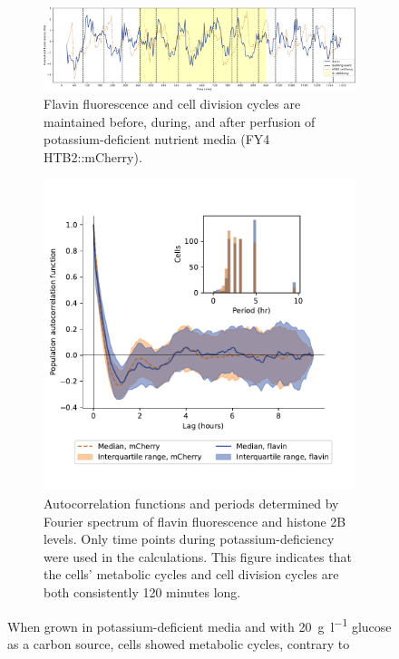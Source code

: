 \begin{figure}
  \centering
  \begin{subfigure}[htpb]{1.0\textwidth}
   \centering
   \includegraphics[width=\textwidth]{htb2mCherry_613_plots_single_htb2mCherry012_90_2_adapted.pdf}
   \caption{
     Flavin fluorescence and cell division cycles are maintained before, during, and after perfusion of potassium-deficient nutrient media (FY4 HTB2::mCherry).
   }
   \label{fig:biology-kdeficient-single}
  \end{subfigure}

  \begin{subfigure}[htpb]{0.7\textwidth}
   \centering
   \includegraphics[width=\textwidth]{htb2mCherry_613_12.pdf}
   \caption{
     Autocorrelation functions and periods determined by Fourier spectrum of flavin fluorescence and histone 2B levels.
     Only time points during potassium-deficiency were used in the calculations.
     This figure indicates that the cells' metabolic cycles and cell division cycles are both consistently 120 minutes long.
   }
   \label{fig:biology-kdeficient-acf}
  \end{subfigure}

  \caption{
    When grown in potassium-deficient media and with \SI{20}{\gram~\litre^{-1}} glucose as a carbon source, cells showed metabolic cycles, contrary to \textcite{oneillEukaryoticCellBiology2020}
  }
  \label{fig:biology-kdeficient}
\end{figure}


